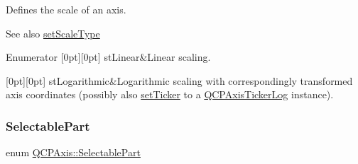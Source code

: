 Defines the scale of an axis. \begin{DoxySeeAlso}{See also}
\mbox{\hyperlink{class_q_c_p_axis_adef29cae617af4f519f6c40d1a866ca6}{set\+Scale\+Type}} 
\end{DoxySeeAlso}
\begin{DoxyEnumFields}{Enumerator}
[0pt][0pt]{}\mbox{\label{class_q_c_p_axis_a36d8e8658dbaa179bf2aeb973db2d6f0aff6e30a11a828bc850caffab0ff994f6}} 
st\+Linear&Linear scaling. \\
\hline

[0pt][0pt]{}\mbox{\label{class_q_c_p_axis_a36d8e8658dbaa179bf2aeb973db2d6f0abf5b785ad976618816dc6f79b73216d4}} 
st\+Logarithmic&Logarithmic scaling with correspondingly transformed axis coordinates (possibly also \mbox{\hyperlink{class_q_c_p_axis_a4ee03fcd2c74d05cd1a419b9af5cfbdc}{set\+Ticker}} to a \mbox{\hyperlink{class_q_c_p_axis_ticker_log}{Q\+C\+P\+Axis\+Ticker\+Log}} instance). \\
\hline

\end{DoxyEnumFields}
\mbox{\label{class_q_c_p_axis_abee4c7a54c468b1385dfce2c898b115f}} 
\subsubsection{\texorpdfstring{SelectablePart}{SelectablePart}}
{\footnotesize\ttfamily enum \mbox{\hyperlink{class_q_c_p_axis_abee4c7a54c468b1385dfce2c898b115f}{Q\+C\+P\+Axis\+::\+Selectable\+Part}}}

